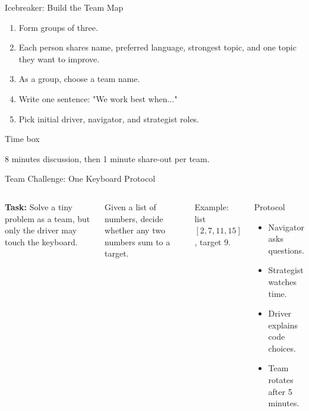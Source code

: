 \documentclass[aspectratio=169,11pt]{beamer}
\newenvironment{cpbox}[1]{%
  \begin{block}{#1}
  }{%
  \end{block}
}
\begin{document}
\begin{frame}{Icebreaker: Build the Team Map}
  \begin{enumerate}
    \item Form groups of three.
    \item Each person shares name, preferred language, strongest topic, and one topic they want to improve.
    \item As a group, choose a team name.
    \item Write one sentence: "We work best when..."
    \item Pick initial driver, navigator, and strategist roles.
  \end{enumerate}

  \vspace{0.35cm}
  \begin{cpbox}{Time box}
    8 minutes discussion, then 1 minute share-out per team.
  \end{cpbox}
\end{frame}

\begin{frame}{Team Challenge: One Keyboard Protocol}
  \begin{columns}[T,onlytextwidth]
      \textbf{Task:} Solve a tiny problem as a team, but only the driver may touch the keyboard.

      \vspace{0.25cm}
      Given a list of numbers, decide whether any two numbers sum to a target.

      \vspace{0.25cm}
      Example: list $[2, 7, 11, 15]$, target $9$.

      \begin{cpbox}{Protocol}
        \begin{itemize}
          \item Navigator asks questions.
          \item Strategist watches time.
          \item Driver explains code choices.
          \item Team rotates after 5 minutes.
        \end{itemize}
      \end{cpbox}
  \end{columns}
\end{frame}
\end{document}
